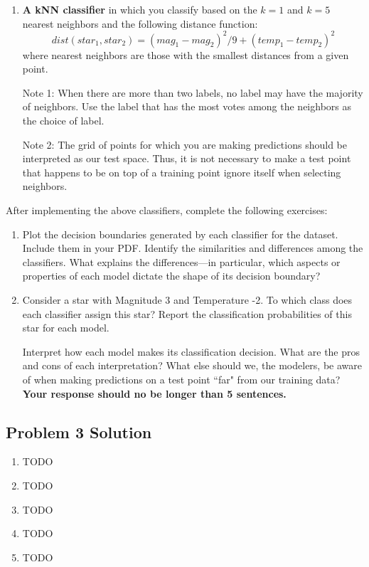\documentclass[submit]{harvardml}
\begin{document}
\begin{problem}
\begin{enumerate}[label=\alph*)]
\item \textbf{A kNN classifier} in which you classify based on the $k = 1$ and $k = 5$ nearest neighbors and the following distance function: $$dist(star_1, star_2) = (mag_1 - mag_2)^2/9 + (temp_1 - temp_2)^2$$
where nearest neighbors are those with the smallest distances from a given point.

  Note 1: When there are more than two labels, no label may have the
  majority of neighbors.  Use the label that has the most votes among
  the neighbors as the choice of label. 

  Note 2: The grid of points for which you are making predictions
  should be interpreted as our test space.  Thus, it is not necessary
  to make a test point that happens to be on top of a training point
  ignore itself when selecting neighbors.

\end{enumerate}

After implementing the above classifiers, complete the following exercises:

\begin{enumerate}
    \item Plot the decision boundaries generated by each classifier for the dataset. Include them in your PDF. 
    Identify the similarities and differences among the classifiers. What explains the differences---in particular, which aspects or properties of each model dictate the shape of its decision boundary? 
    
    \item 
    
    Consider a star with Magnitude 3 and Temperature -2. To which class does each classifier assign this star? Report the classification probabilities of this star for each model. 
    
    Interpret how each model makes its classification decision. What are the pros and cons of each interpretation? What else should we, the modelers, be aware of when making predictions on a test point ``far" from our training data? \textbf{Your response should no be longer than 5 sentences.}
\end{enumerate}
\end{problem}

\newpage

\color{blue}
\subsection*{Problem 3 Solution}
\begin{enumerate}
    \item TODO
    \item TODO
    \item TODO
    \item TODO 
    \item TODO 
\end{enumerate}
\color{black}
\pagebreak
\end{document}
